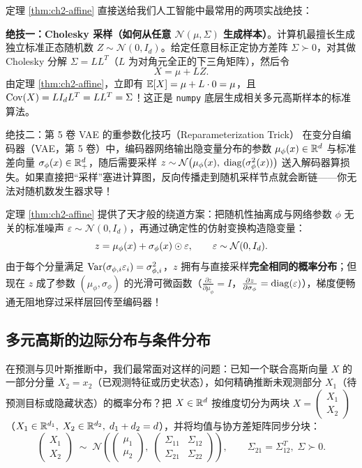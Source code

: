 定理 \ref{thm:ch2-affine} 直接送给我们人工智能中最常用的两项实战绝技：

\textbf{绝技一：Cholesky 采样（如何从任意 $\mathcal{N}(\mu, \Sigma)$ 生成样本）}。计算机最擅长生成独立标准正态随机数 $Z \sim \mathcal{N}(0, I_d)$。给定任意目标正定协方差阵 $\Sigma \succ 0$，对其做 Cholesky 分解 $\Sigma = L L^T$（$L$ 为对角元全正的下三角矩阵），然后令
\begin{equation}
  X = \mu + L Z. \label{eq:ch2-cholesky-sample}
\end{equation}
由定理 \ref{thm:ch2-affine}，立即有 $\mathbb{E}[X] = \mu + L\cdot 0 = \mu$，且 $\operatorname{Cov}(X) = L I_d L^T = L L^T = \Sigma$！这正是 \texttt{numpy} 底层生成相关多元高斯样本的标准算法。

\begin{insightBox}{绝技二：第 5 卷 VAE 的重参数化技巧（Reparameterization Trick）}
在变分自编码器（VAE，第 5 卷）中，编码器网络输出隐变量分布的参数 $\mu_\phi(x) \in \mathbb{R}^d$ 与标准差向量 $\sigma_\phi(x) \in \mathbb{R}_+^d$，随后需要采样 $z \sim \mathcal{N}\bigl(\mu_\phi(x),\; \operatorname{diag}(\sigma_\phi^2(x))\bigr)$ 送入解码器算损失。如果直接把“采样”塞进计算图，反向传播走到随机采样节点就会断链——你无法对随机数发生器求导！

定理 \ref{thm:ch2-affine} 提供了天才般的绕道方案：把随机性抽离成与网络参数 $\phi$ 无关的标准噪声 $\varepsilon \sim \mathcal{N}(0, I_d)$，再通过确定性的仿射变换构造隐变量：
\[
  z = \mu_\phi(x) + \sigma_\phi(x) \odot \varepsilon, \qquad \varepsilon \sim \mathcal{N}(0, I_d).
\]
由于每个分量满足 $\operatorname{Var}(\sigma_{\phi,i}\varepsilon_i) = \sigma_{\phi,i}^2$，$z$ 拥有与直接采样\textbf{完全相同的概率分布}；但现在 $z$ 成了参数 $(\mu_\phi, \sigma_\phi)$ 的光滑可微函数（$\frac{\partial z}{\partial \mu_\phi} = I$，$\frac{\partial z}{\partial \sigma_\phi} = \operatorname{diag}(\varepsilon)$），梯度便畅通无阻地穿过采样层回传至编码器！
\end{insightBox}

\subsection{多元高斯的边际分布与条件分布}

在预测与贝叶斯推断中，我们最常面对这样的问题：已知一个联合高斯向量 $X$ 的一部分分量 $X_2 = x_2$（已观测特征或历史状态），如何精确推断未观测部分 $X_1$（待预测目标或隐藏状态）的概率分布？把 $X \in \mathbb{R}^d$ 按维度切分为两块 $X = \begin{pmatrix} X_1 \\ X_2 \end{pmatrix}$（$X_1 \in \mathbb{R}^{d_1},\; X_2 \in \mathbb{R}^{d_2},\; d_1+d_2=d$），并将均值与协方差矩阵同步分块：
\[
  \begin{pmatrix} X_1 \\ X_2 \end{pmatrix}
  \;\sim\;
  \mathcal{N}\!\left(
    \begin{pmatrix} \mu_1 \\ \mu_2 \end{pmatrix},\;
    \begin{pmatrix} \Sigma_{11} & \Sigma_{12} \\ \Sigma_{21} & \Sigma_{22} \end{pmatrix}
  \right), \qquad \Sigma_{21} = \Sigma_{12}^T,\; \Sigma \succ 0.
\]

